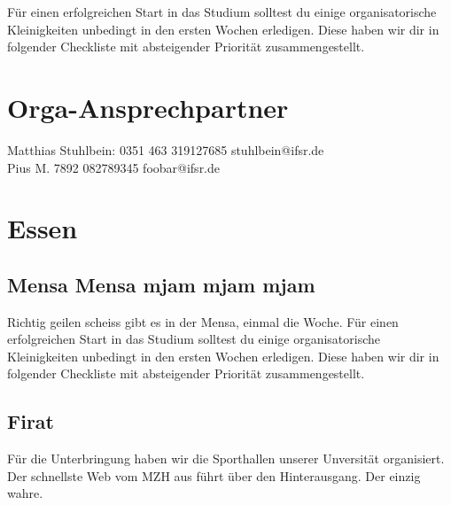 
Für einen erfolgreichen Start in das Studium solltest du einige organisatorische
Kleinigkeiten unbedingt in den ersten Wochen erledigen. Diese haben wir dir in
folgender Checkliste mit absteigender Priorität zusammengestellt.

\section*{Orga-Ansprechpartner}

Matthias Stuhlbein: 0351 463 319127685 stuhlbein@ifsr.de \\
Pius M. 7892 082789345 foobar@ifsr.de

\section*{Essen}
\subsection*{Mensa Mensa mjam mjam mjam}

Richtig geilen scheiss gibt es in der Mensa, einmal die Woche. Für einen erfolgreichen Start in das Studium solltest du einige organisatorische
Kleinigkeiten unbedingt in den ersten Wochen erledigen. Diese haben wir dir in
folgender Checkliste mit absteigender Priorität zusammengestellt.

\subsection*{Firat}

Für die Unterbringung haben wir die Sporthallen unserer Unversität organisiert. Der schnellste Web vom MZH aus führt über den Hinterausgang.
Der einzig wahre.
